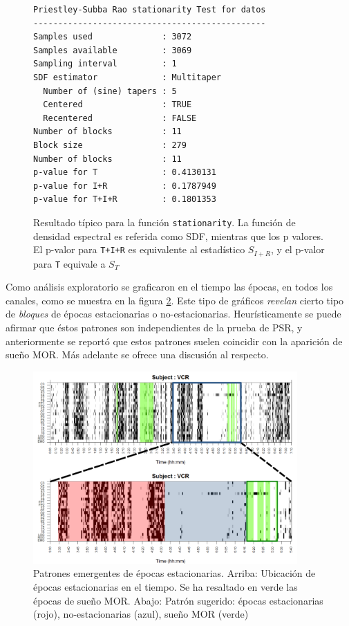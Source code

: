\begin{figure}
\centering
\begin{lstlisting}[caption={}]
Priestley-Subba Rao stationarity Test for datos
-----------------------------------------------
Samples used              : 3072 
Samples available         : 3069 
Sampling interval         : 1 
SDF estimator             : Multitaper 
  Number of (sine) tapers : 5 
  Centered                : TRUE 
  Recentered              : FALSE 
Number of blocks          : 11 
Block size                : 279 
Number of blocks          : 11 
p-value for T             : 0.4130131 
p-value for I+R           : 0.1787949 
p-value for T+I+R         : 0.1801353 
\end{lstlisting}
\caption[Resultado típico para la función \texttt{stationarity}]
{Resultado típico para la función \texttt{stationarity}. La función de densidad espectral es
referida como SDF, mientras que los p valores. El p-valor para \texttt{T+I+R} es equivalente al 
estadístico $S_{I+R}$, y el p-valor para \texttt{T} equivale a $S_T$
}
\label{res_psr}
\end{figure}

Como análisis exploratorio se graficaron en el tiempo las épocas, en todos los canales, como se 
muestra en la figura \ref{patroncito}. Este tipo de gráficos \textit{revelan} cierto tipo de 
\textit{bloques} de épocas estacionarias o no-estacionarias. Heurísticamente se puede afirmar que 
éstos patrones son independientes de la prueba de PSR, y anteriormente se reportó que estos patrones
suelen coincidir con la aparición de sueño MOR. Más adelante se ofrece una discusión al 
respecto.

\begin{figure}
\centering
\includegraphics[width=0.9\textwidth]
{./img_ejemplos/zoom_VCR.pdf}
\caption[Patrones emergentes de épocas estacionarias]
{Patrones emergentes de épocas estacionarias. Arriba: 
Ubicación de épocas estacionarias en el tiempo. Se ha resaltado en verde las épocas de sueño MOR.
Abajo: Patrón sugerido: épocas estacionarias (rojo), no-estacionarias (azul), sueño MOR (verde)}
\label{patroncito}
\end{figure}


